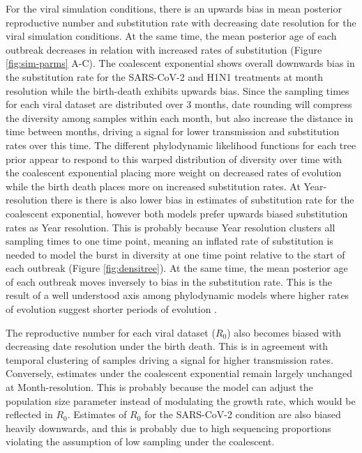 \documentclass{article}
\begin{document}
\begin{spacing}{1.5}
For the viral simulation conditions, there is an upwards bias in mean posterior reproductive number and substitution rate with decreasing date resolution for the viral simulation conditions. At the same time, the mean posterior age of each outbreak decreases in relation with increased rates of substitution (Figure \ref{fig:sim-parms} A-C). The coalescent exponential shows overall downwards bias in the substitution rate for the SARS-CoV-2 and H1N1 treatments at month resolution while the birth-death exhibits upwards bias. Since the sampling times for each viral dataset are distributed over 3 months, date rounding will compress the diversity among samples within each month, but also increase the distance in time between months, driving a signal for lower transmission and substitution rates over this time. The different phylodynamic likelihood functions for each tree prior appear to respond to this warped distribution of diversity over time with the coalescent exponential placing more weight on decreased rates of evolution while the birth death places more on increased substitution rates. At Year-resolution there is there is also lower bias in estimates of substitution rate for the coalescent exponential, however both models prefer upwards biased substitution rates as Year resolution. This is probably because Year resolution clusters all sampling times to one time point, meaning an inflated rate of substitution is needed to model the burst in diversity at one time point relative to the start of each outbreak (Figure \ref{fig:densitree}). At the same time, the mean posterior age of each outbreak moves inversely to bias in the substitution rate. This is the result of a well understood axis among phylodynamic models where higher rates of evolution suggest shorter periods of evolution \citep{featherstone_decoding_2023}.

The reproductive number for each viral dataset ($R_0$) also becomes biased with decreasing date resolution under the birth death. This is in agreement with temporal clustering of samples driving a signal for higher transmission rates. Conversely, estimates under the coalescent exponential remain largely unchanged at Month-resolution. This is probably because the model can adjust the population size parameter instead of modulating the growth rate, which would be reflected in $R_0$. Estimates of $R_0$ for the SARS-CoV-2 condition are also biased heavily downwards, and this is probably due to high sequencing proportions violating the assumption of low sampling under the coalescent.


\end{spacing}
\end{document}
